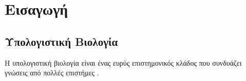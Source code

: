 \documentclass[10pt,a4paper, openany]{book}
\begin{document}
\tableofcontents	%
\mainmatter		%
\chapter{Εισαγωγή}
\label{ch:intro}	%
\section{Υπολογιστική Βιολογία}
\label{sec:compbio}
Η υπολογιστική βιολογία είναι ένας ευρύς επιστημονικός κλάδος που συνδυάζει γνώσεις από πολλές επιστήμες \cite{lykeio}. 



%
% 
\end{document}
